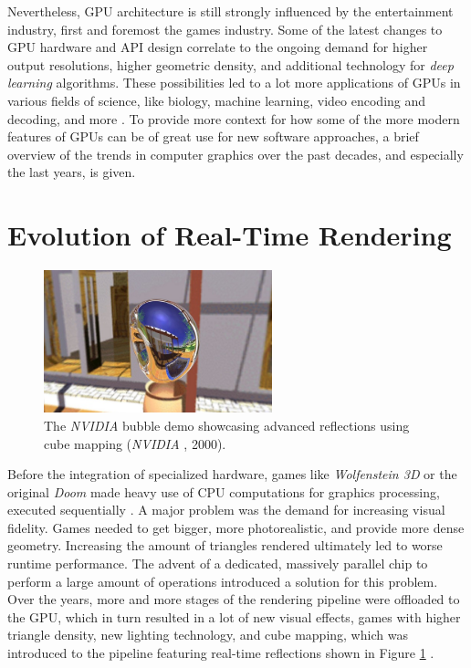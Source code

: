 \noindent
Nevertheless, \ac{GPU} architecture is still strongly influenced by the entertainment 
industry, first and foremost the games industry. Some of the latest changes to \ac{GPU} 
hardware and \ac{API} design correlate to the ongoing demand for higher output resolutions, 
higher geometric density, and additional technology for \emph{deep learning} algorithms. 
These possibilities led to a lot more applications of \ac{GPU}s in various fields of science, 
like biology, machine learning, video encoding and decoding, and more \cite{Battaglia2024}.
To provide more context for how some of the more modern features of \ac{GPU}s can be of great 
use for new software approaches, a brief overview of the trends in computer graphics over 
the past decades, and especially the last years, is given.


\section{Evolution of Real-Time Rendering} \label{sec-evolution-of-real-time-rendering}

\begin{figure}[h]
    \centering
    \includegraphics[width=250px]{images/graphics/bubble-reflection-effects-demo.jpg}
    \caption{The \emph{NVIDIA} bubble demo showcasing advanced reflections using cube mapping (\emph{NVIDIA} \cite{NVIDIABubble}, 2000).}
    \label{fig:bubble-reflection-demo}
\end{figure}

\noindent
Before the integration of specialized hardware, games like \emph{Wolfenstein 3D} or the 
original \emph{Doom} made heavy use of \ac{CPU} computations for graphics processing, 
executed sequentially \cite{NVIDIA1999}. A major problem was the demand for increasing 
visual fidelity. Games needed to get bigger, more photorealistic, and provide more dense 
geometry. Increasing the amount of triangles rendered ultimately led to worse runtime 
performance. The advent of a dedicated, massively parallel chip to perform a large amount of 
operations introduced a solution for this problem. Over the years, more and more stages of the 
rendering pipeline were offloaded to the \ac{GPU}, which in turn resulted in a lot of new visual 
effects, games with higher triangle density, new lighting technology, and cube mapping, which 
was introduced to the pipeline featuring real-time reflections shown in  Figure 
\ref{fig:bubble-reflection-demo} \cite{Battaglia2024}.


